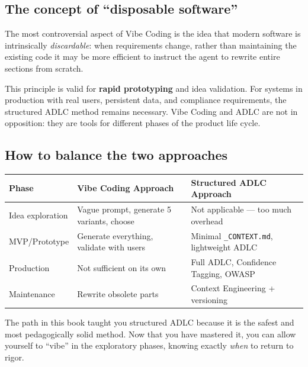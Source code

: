 \subsection{The concept of ``disposable software''}

The most controversial aspect of Vibe Coding is the idea that modern software is intrinsically \textit{discardable}: when requirements change, rather than maintaining the existing code it may be more efficient to instruct the agent to rewrite entire sections from scratch.

\begin{notebox}
This principle is valid for \textbf{rapid prototyping} and idea validation. For systems in production with real users, persistent data, and compliance requirements, the structured ADLC method remains necessary. Vibe Coding and ADLC are not in opposition: they are tools for different phases of the product life cycle.
\end{notebox}

\subsection{How to balance the two approaches}

\begin{center}
\begin{small}
\begin{tabularx}{\textwidth}{l X X}
\toprule
\textbf{Phase} & \textbf{Vibe Coding Approach} & \textbf{Structured ADLC Approach} \\
\midrule
Idea exploration & Vague prompt, generate 5 variants, choose & Not applicable --- too much overhead \\
MVP/Prototype & Generate everything, validate with users & Minimal \texttt{\_CONTEXT.md}, lightweight ADLC \\
Production & Not sufficient on its own & Full ADLC, Confidence Tagging, OWASP \\
Maintenance & Rewrite obsolete parts & Context Engineering + versioning \\
\bottomrule
\end{tabularx}
\end{small}
\end{center}

\begin{tipbox}
The path in this book taught you structured ADLC because it is the safest and most pedagogically solid method. Now that you have mastered it, you can allow yourself to ``vibe'' in the exploratory phases, knowing exactly \textit{when} to return to rigor.
\end{tipbox}

